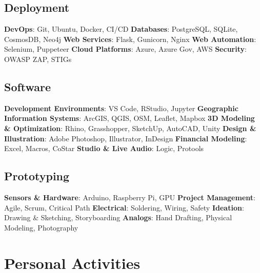 \documentclass{article}
\begin{document}
    \subsection*{Deployment}
        \textbf{DevOps}: Git, Ubuntu, Docker, CI/CD\newline
        \textbf{Databases}: PostgreSQL, SQLite, CosmosDB, Neo4j\newline
        \textbf{Web Services}: Flask, Gunicorn, Nginx\newline
        \textbf{Web Automation}: Selenium, Puppeteer\newline
        \textbf{Cloud Platforms}: Azure, Azure Gov, AWS\newline
        \textbf{Security}: OWASP ZAP, STIGs
    \subsection*{Software}
        \textbf{Development Environments}: VS Code, RStudio, Jupyter\newline
        \textbf{Geographic Information Systems}: ArcGIS, QGIS, OSM, Leaflet, Mapbox\newline
        \textbf{3D Modeling \& Optimization}: Rhino, Grasshopper, SketchUp, AutoCAD, Unity\newline
        \textbf{Design \& Illustration}: Adobe Photoshop, Illustrator, InDesign\newline
        \textbf{Financial Modeling}: Excel, Macros, CoStar\newline
        \textbf{Studio \& Live Audio}: Logic, Protools
    \subsection*{Prototyping}
        \textbf{Sensors \& Hardware}: Arduino, Raspberry Pi, GPU\newline
        \textbf{Project Management}: Agile, Scrum, Critical Path\newline
        \textbf{Electrical}: Soldering, Wiring, Safety\newline
        \textbf{Ideation}: Drawing \& Sketching, Storyboarding\newline
        \textbf{Analogs}: Hand Drafting, Physical Modeling, Photography
\newpage
    \section*{Personal Activities}
\end{document}
